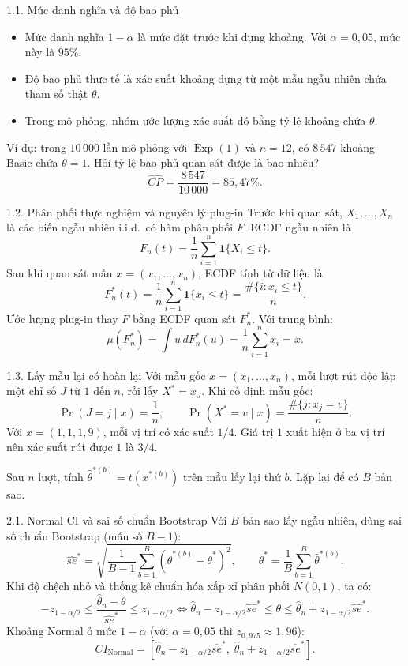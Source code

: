 \documentclass[aspectratio=43,10pt]{beamer}
\begin{document}
\begin{frame}{1.1. Mức danh nghĩa và độ bao phủ}
    \begin{itemize}
        \item Mức danh nghĩa $1-\alpha$ là mức đặt trước khi dựng khoảng. Với $\alpha=0{,}05$, mức này là $95\%$.
        \item Độ bao phủ thực tế là xác suất khoảng dựng từ một mẫu ngẫu nhiên chứa tham số thật $\theta$.
        \item Trong mô phỏng, nhóm ước lượng xác suất đó bằng tỷ lệ khoảng chứa $\theta$.
    \end{itemize}
    \medskip
    Ví dụ: trong $10\,000$ lần mô phỏng với $\operatorname{Exp}(1)$ và $n=12$, có $8\,547$ khoảng Basic chứa $\theta=1$. Hỏi tỷ lệ bao phủ quan sát được là bao nhiêu?
    \[
    \widehat{CP}=\frac{8\,547}{10\,000}=85{,}47\%.
    \]
\end{frame}

\begin{frame}{1.2. Phân phối thực nghiệm và nguyên lý plug-in}
    Trước khi quan sát, $X_1,\ldots,X_n$ là các biến ngẫu nhiên i.i.d.\ có hàm phân phối $F$. ECDF ngẫu nhiên là
    \[
    F_n(t)=\frac{1}{n}\sum_{i=1}^n \mathbf{1}\{X_i\le t\}.
    \]
    Sau khi quan sát mẫu $x=(x_1,\ldots,x_n)$, ECDF tính từ dữ liệu là
    \[
    F_n^*(t)=\frac{1}{n}\sum_{i=1}^n \mathbf{1}\{x_i\le t\}
            =\frac{\#\{i:x_i\le t\}}{n}.
    \]
    Ước lượng plug-in thay $F$ bằng ECDF quan sát $F_n^*$. Với trung bình:
    \[
    \mu(F_n^*)=\int u\,dF_n^*(u)=\frac{1}{n}\sum_{i=1}^n x_i=\bar x.
    \]
\end{frame}

\begin{frame}{1.3. Lấy mẫu lại có hoàn lại}
    Với mẫu gốc $x=(x_1,\ldots,x_n)$, mỗi lượt rút độc lập một chỉ số $J$ từ $1$ đến $n$, rồi lấy $X^*=x_J$. Khi cố định mẫu gốc:
    \[
    \Pr(J=j\mid x)=\frac{1}{n},
    \qquad
    \Pr(X^*=v\mid x)=\frac{\#\{j:x_j=v\}}{n}.
    \]
    Với $x=(1,1,1,9)$, mỗi vị trí có xác suất $1/4$. Giá trị $1$ xuất hiện ở ba vị trí nên xác suất rút được $1$ là $3/4$.
    \medskip

    Sau $n$ lượt, tính $\hat\theta^{*(b)}=t(x^{*(b)})$ trên mẫu lấy lại thứ $b$. Lặp lại để có $B$ bản sao.
\end{frame}

\begin{frame}{2.1. Normal CI và sai số chuẩn Bootstrap}
    Với $B$ bản sao lấy ngẫu nhiên, dùng sai số chuẩn Bootstrap (mẫu số $B-1$):
    \[
    \widehat{se}^{*}=
    \sqrt{\frac{1}{B-1}\sum_{b=1}^{B}(\hat\theta^{*(b)}-\bar\theta^*)^2},
    \qquad \bar\theta^*=\frac{1}{B}\sum_{b=1}^{B}\hat\theta^{*(b)}.
    \]
    Khi độ chệch nhỏ và thống kê chuẩn hóa xấp xỉ phân phối $N(0,1)$, ta có:
    \[
    -z_{1-\alpha/2}\le\frac{\hat\theta_n-\theta}{\widehat{se}^*}\le z_{1-\alpha/2}
    \iff
    \hat\theta_n-z_{1-\alpha/2}\widehat{se}^*\le\theta\le\hat\theta_n+z_{1-\alpha/2}\widehat{se}^*.
    \]
    Khoảng Normal ở mức $1-\alpha$ (với $\alpha=0{,}05$ thì $z_{0{,}975}\approx1{,}96$):
    \[
    CI_{\text{Normal}}=\left[\hat\theta_n-z_{1-\alpha/2}\widehat{se}^*,\;\hat\theta_n+z_{1-\alpha/2}\widehat{se}^*\right].
    \]
\end{frame}
\end{document}
